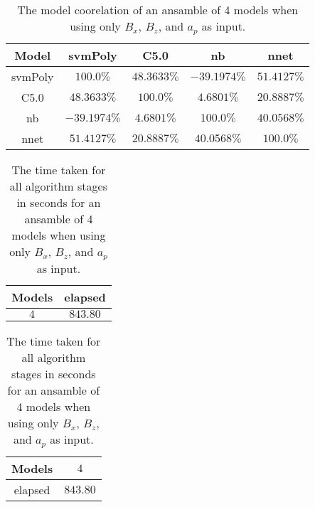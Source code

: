 \begin{table}[!ht]
	\centering
	\begin{tabular}{|c|c|c|c|c|}
		\hline
		Model & svmPoly & C5.0 & nb & nnet \\ \hline
		svmPoly & $100.0\%$ & $48.3633\%$ & $-39.1974\%$ & $51.4127\%$ \\ \hline
		C5.0 & $48.3633\%$ & $100.0\%$ & $4.6801\%$ & $20.8887\%$ \\ \hline
		nb & $-39.1974\%$ & $4.6801\%$ & $100.0\%$ & $40.0568\%$ \\ \hline
		nnet & $51.4127\%$ & $20.8887\%$ & $40.0568\%$ & $100.0\%$ \\ \hline
	\end{tabular}
	\caption{The model coorelation of an ansamble of 4 models when using only $B_{x}$, $B_{z}$, and $a_{p}$ as input.}
	\label{tab:ansamble4:xzap}
\end{table}

\begin{table}[!ht]
	\centering
	\begin{tabular}{|c|c|}
		\hline
		Models & elapsed \\ \hline
		$4$ & $843.80$ \\ \hline
	\end{tabular}
	\caption{The time taken for all algorithm stages in seconds for an ansamble of 4 models when using only $B_{x}$, $B_{z}$, and $a_{p}$ as input.}
	\label{tab:time:ansamble:xzap:4}
\end{table}

\begin{table}[!ht]
	\centering
	\begin{tabular}{|c|c|}
		\hline
		Models & $4$ \\ \hline
		elapsed & $843.80$ \\ \hline
	\end{tabular}
	\caption{The time taken for all algorithm stages in seconds for an ansamble of 4 models when using only $B_{x}$, $B_{z}$, and $a_{p}$ as input.}
	\label{tab:time:ansamble:reverse:xzap:4}
\end{table}

